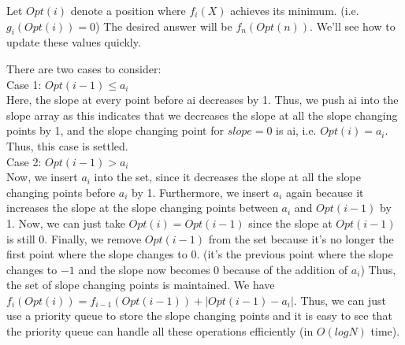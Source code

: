 Let $Opt(i)$ denote a position where $f_{i}(X)$ achieves its minimum. (i.e. $g_{i}(Opt(i)) = 0$) The desired answer will be $f_{n}(Opt(n))$. We'll see how to update these values quickly.

There are two cases to consider: \\
Case 1: $Opt(i-1) \leq a_{i}$ \\
Here, the slope at every point before ai decreases by 1. Thus, we push ai into the slope array as this indicates that we decreases the slope at all the slope changing points by 1, 
and the slope changing point for $slope=0$ is ai, i.e. $Opt(i) = a_{i}$. Thus, this case is settled. \\

Case 2: $Opt(i-1) > a_{i}$ \\
Now, we insert $a_{i}$ into the set, since it decreases the slope at all the slope changing points before $a_{i}$ by 1. 
Furthermore, we insert $a_{i}$ again because it increases the slope at the slope changing points between $a_{i}$ and $Opt(i-1)$ by 1.
Now, we can just take $Opt(i) = Opt(i-1)$ since the slope at $Opt(i-1)$ is still 0. Finally, we remove $Opt(i-1)$
from the set because it's no longer the first point where the slope changes to 0. 
(it's the previous point where the slope changes to $-1$ and the slope now becomes 0 because of the addition of $a_{i}$)
Thus, the set of slope changing points is maintained. We have $f_{i}(Opt(i)) = f_{i-1}(Opt(i-1))+|Opt(i-1)-a_{i}|$.
Thus, we can just use a priority queue to store the slope changing points and it is easy to see that the priority queue can handle all these operations efficiently (in $O(log N)$ time). \\



